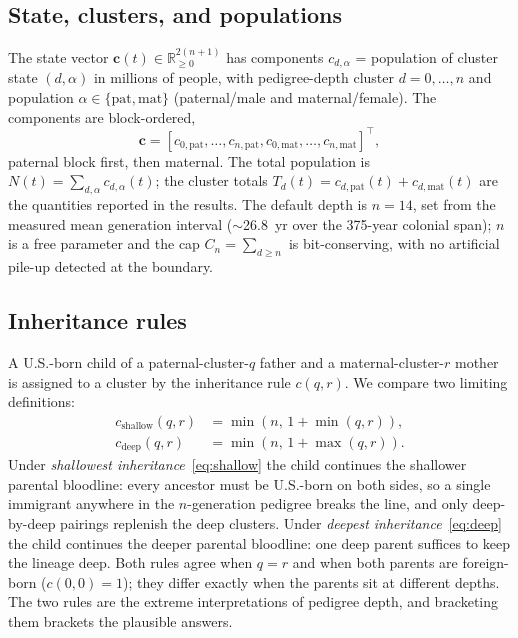 \documentclass[11pt,a4paper]{article}
\begin{document}
\subsection{State, clusters, and populations}
\label{sec:state}
The state vector $\mathbf{c}(t)\in\mathbb{R}^{2(n+1)}_{\ge 0}$ has
components $c_{d,\alpha}$ = population of cluster state $(d,\alpha)$ in
millions of people, with pedigree-depth cluster $d=0,\dots,n$ and
population $\alpha\in\{\mathrm{pat},\mathrm{mat}\}$ (paternal/male and
maternal/female).  The components are block-ordered,
\[
  \mathbf{c}=[c_{0,\mathrm{pat}},\dots,c_{n,\mathrm{pat}},
              c_{0,\mathrm{mat}},\dots,c_{n,\mathrm{mat}}]^\top,
\]
paternal block first, then maternal.  The total population is
$N(t)=\sum_{d,\alpha}c_{d,\alpha}(t)$; the cluster totals
$T_d(t)=c_{d,\mathrm{pat}}(t)+c_{d,\mathrm{mat}}(t)$ are the quantities
reported in the results.  The default depth is $n=14$, set from the
measured mean generation interval ($\sim$26.8~yr over the 375-year
colonial span); $n$ is a free parameter and the cap
$C_n=\sum_{d\ge n}$ is bit-conserving, with no artificial pile-up
detected at the boundary.

\subsection{Inheritance rules}
\label{sec:rules}
A U.S.-born child of a paternal-cluster-$q$ father and a
maternal-cluster-$r$ mother is assigned to a cluster by the inheritance
rule $c(q,r)$.  We compare two limiting definitions:
\begin{align}
  c_{\mathrm{shallow}}(q,r) &= \min(n,\,1+\min(q,r)),
  \label{eq:shallow}\\
  c_{\mathrm{deep}}(q,r)    &= \min(n,\,1+\max(q,r)).
  \label{eq:deep}
\end{align}
Under \emph{shallowest inheritance}~\eqref{eq:shallow} the child
continues the shallower parental bloodline: every ancestor must be
U.S.-born on both sides, so a single immigrant anywhere in the
$n$-generation pedigree breaks the line, and only deep-by-deep pairings
replenish the deep clusters.  Under \emph{deepest
inheritance}~\eqref{eq:deep} the child continues the deeper parental
bloodline: one deep parent suffices to keep the lineage deep.  Both
rules agree when $q=r$ and when both parents are foreign-born
($c(0,0)=1$); they differ exactly when the parents sit at different
depths.  The two rules are the extreme interpretations of pedigree
depth, and bracketing them brackets the plausible answers.
\end{document}
